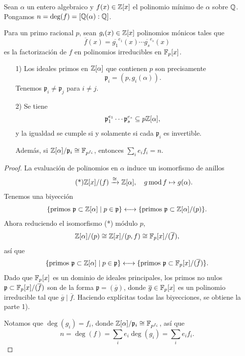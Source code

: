 \begin{teorema}
  \label{teorema:kummer-dedekind}
  Sean $\alpha$ un entero algebraico y $f (x) \in \mathbb{Z} [x]$ el polinomio mínimo
  de $\alpha$ sobre $\mathbb{Q}$. Pongamos $n = \deg (f) = [\mathbb{Q} (\alpha) : \mathbb{Q}]$.

  Para un primo racional $p$, sean $g_i (x) \in \mathbb{Z} [x]$ polinomios mónicos
  tales que
  $$\overline{f} (x) = \overline{g_1}^{e_1} (x) \cdots \overline{g_s}^{e_s} (x)$$
  es la factorización de $f$ en polinomios irreducibles en $\mathbb{F}_p [x]$.

  \begin{enumerate}
  \item[1)] Los ideales primos en $\mathbb{Z} [\alpha]$ que contienen $p$ son precisamente
    $$\mathfrak{p}_i = (p, g_i (\alpha)).$$
    Tenemos $\mathfrak{p}_i \ne \mathfrak{p}_j$ para $i\ne j$.

  \item[2)] Se tiene
    $$\mathfrak{p}_1^{e_1} \cdots \mathfrak{p}_s^{e_s} \subseteq p \mathbb{Z} [\alpha],$$
    y la igualdad se cumple si y solamente si cada $\mathfrak{p}_i$ es invertible.

    Además, si $\mathbb{Z} [\alpha]/\mathfrak{p}_i \cong \mathbb{F}_{p^{f_i}}$,
    entonces $\sum_i e_i f_i = n$.
  \end{enumerate}

  \begin{proof}
    La evaluación de polinomios en $\alpha$ induce un isomorfismo de anillos
    \[ \tag{*} \mathbb{Z} [x] / (f) \xrightarrow{\cong} \mathbb{Z} [\alpha], \quad
       g \operatorname{mod} f \mapsto g (\alpha). \]
    Tenemos una biyección
    \[ \{ \text{primos }\mathfrak{p}\subset\mathbb{Z}[\alpha] \mid p\in\mathfrak{p} \}
       \longleftrightarrow
       \{ \text{primos }\mathfrak{p} \subset \mathbb{Z}[\alpha]/(p) \}. \]
    Ahora reduciendo el isomorfismo (*) módulo $p$,
    $$\mathbb{Z}[\alpha]/(p) \cong \mathbb{Z} [x] / (p,f) \cong \mathbb{F}_p [x]/(\overline{f}),$$
    así que
    \[ \{ \text{primos }\mathfrak{p}\subset\mathbb{Z}[\alpha] \mid p \in \mathfrak{p} \}
       \longleftrightarrow
       \{ \text{primos }\mathfrak{p}\subset\mathbb{F}_p [x]/(\overline{f}) \}. \]
    Dado que $\mathbb{F}_p [x]$ es un dominio de ideales principales, los primos no
    nulos $\mathfrak{p} \subset \mathbb{F}_p [x]/(\overline{f})$ son de la forma
    $\mathfrak{p} = (\overline{g})$, donde $\overline{g} \in \mathbb{F}_p [x]$
    es un polinomio irreducible tal que $\overline{g} \mid \overline{f}$.
    Haciendo explícitas todas las biyecciones, se obtiene la parte 1).

    Notamos que $\deg (g_i) = f_i$, donde
    $\mathbb{Z}[\alpha]/\mathfrak{p}_i \cong \mathbb{F}_{p^{f_i}}$, así que
    $$n = \deg (f) = \sum_i e_i \deg (g_i) = \sum_i e_i f_i.$$


\end{proof}
\end{teorema}
